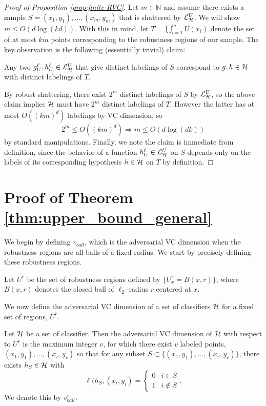 \begin{proof}[Proof of Proposition \ref{prop:finite-RVC}] Let $m \in \mathbb{N}$ and assume there exists a sample $S=(x_1,y_1), \ldots, (x_m,y_m)$ that is shattered by $\mathcal{L}^U_{\mathcal H}$. We will show $m \leq O(d\log(kd))$. With this in mind, let $T=\bigcup_{i=1}^m U(x_i)$ denote the set of at most $km$ points corresponding to the robustness regions of our sample. The key observation is the following (essentially trivial) claim:
\begin{claim}
Any two $g_{U}^\ell,h_{U}^\ell \in \mathcal{L}^U_{\mathcal H}$ that give distinct labelings of $S$ correspond to $g,h \in \mathcal H$ with distinct labelings of $T$.
\end{claim} 
By robust shattering, there exist $2^m$ distinct labelings of $S$ by $\mathcal{L}^U_{\mathcal H}$, so the above claim implies $\mathcal H$ must have $2^m$ distinct labelings of $T$. However the latter has at most $O((km)^d)$ labelings by VC dimension, so
\[
2^m \leq O((km)^d) \Rightarrow m \leq O(d\log(dk))
\]
by standard manipulations. Finally, we note the claim is immediate from definition, since the behavior of a function $h_U^\ell \in \mathcal{L}^U_{\mathcal H}$ on $S$ depends only on the labels of its corresponding hypothesis $h \in \mathcal H$ on $T$ by definition. 
\end{proof}

\section{Proof of Theorem \ref{thm:upper_bound_general}}\label{sec:proof_extension}

We begin by defining $v_{ball}$, which is the adversarial VC dimension when the robustness regions are all balls of a fixed radius. We start by precisely defining these robustness regions. 

\begin{defn}
Let $U^r$ be the set of robustness regions defined by $\{U_x^r = B(x, r)\}$, where $B(x, r)$ denotes the closed ball of $\ell_2$-radius $r$ centered at $x$. 
\end{defn}

We now define the adversarial VC dimension of a set of classifiers $\mathcal H$ for a fixed set of regions, $U^r$.

\begin{defn}
Let $\mathcal H$ be a set of classifier. Then the adversarial VC dimension of $\mathcal H$ with respect to $U^r$ is the maximum integer $v$, for which there exist $v$ labeled points, $(x_1, y_1), \dots, (x_r, y_r)$ so that for any subset $S \subset \{(x_1, y_1) ,\dots, (x_r, y_r)\}$, there exists $h_S \in \mathcal H$ with $$\ell(h_S, (x_i, y_i) = \begin{cases}0 & i \in S \\ 1 & i \notin S\end{cases}.$$ We denote this by $v_{ball}^r$.
\end{defn}

